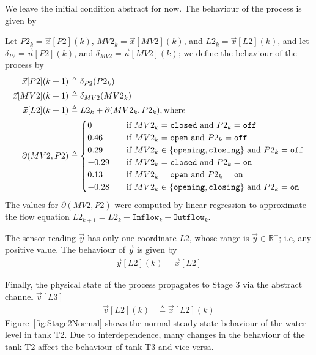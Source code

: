 {{We leave the initial condition abstract for now. The behaviour of the process is given by

Let $P2_k=\vec{x}[P2](k)$, $MV2_k=\vec{x}[MV2](k)$, and $L2_k=\vec{x}[L2](k)$, and let $\delta_{P2}=\vec{u}[P2](k)$, and $\delta_{MV2}=\vec{u}[MV2](k)$; we define the behaviour of the process by
\begin{align*}
\vec{x}[P2](k+1)&\triangleq \delta_{P2}(P2_k)\\
\vec{x}[MV2](k+1)&\triangleq \delta_{MV2}(MV2_k)\\
\vec{x}[L2](k+1)&\triangleq L2_k+\partial(MV2_k,P2_k),\text{where}\\
\partial(MV2,P2)&\triangleq
\begin{cases}
  0&\quad \text{if $MV2_k=\texttt{closed}$ and $P2_k=\texttt{off}$}\\
  0.46&\quad \text{if $MV2_k=\texttt{open}$ and $P2_k=\texttt{off}$}\\
  0.29&\quad \text{if $MV2_k\in\left\{\texttt{opening},\texttt{closing}\right\}$ and $P2_k=\texttt{off}$}\\
  -0.29&\quad \text{if $MV2_k=\texttt{closed}$ and $P2_k=\texttt{on}$}\\
  0.13&\quad \text{if $MV2_k=\texttt{open}$ and $P2_k=\texttt{on}$}\\
  -0.28&\quad \text{if $MV2_k\in\left\{\texttt{opening},\texttt{closing}\right\}$ and $P2_k=\texttt{on}$}\\  
\end{cases}
\end{align*}
The values for $\partial(MV2,P2)$ were computed by linear regression to approximate the flow equation $L2_{k+1}=L2_{k}+\texttt{Inflow}_k-\texttt{Outflow}_k$.

The sensor reading $\vec{y}$ has only one coordinate $L2$, whose range is $\vec{y}\in \mathbb{R}^+$; i.e, any positive value. The behaviour of $\vec{y}$ is given by 
\begin{align}
  \vec{y}[L2](k)=\vec{x}[L2]
\end{align}

Finally, the physical state of the process propagates to Stage 3 via the abstract channel $\vec{v}[L3]$
\begin{align}
  \vec{v}[L2](k)&\triangleq \vec{x}[L2](k)
\end{align}
Figure~\ref{fig:Stage2Normal} shows the normal steady state behaviour of the water level in tank T2. Due to interdependence, many changes in the behaviour of the tank T2 affect the behaviour of tank T3 and vice versa. 

}}

